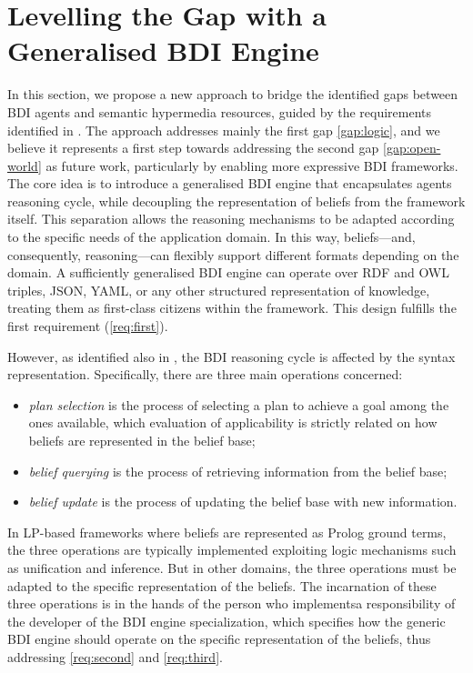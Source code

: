 \documentclass[
]{ceurart}
\begin{document}
\section{Levelling the Gap with a Generalised BDI Engine}
\label{sec:generalized-bdi-engine}

In this section,
we propose a new approach to bridge the identified gaps between \ac{BDI} agents and semantic hypermedia resources,
guided by the requirements identified in .
%
The approach addresses mainly the first gap \ref{gap:logic}, 
and we believe it represents a first step towards addressing the second gap \ref{gap:open-world} as future work,
particularly by enabling more expressive \ac{BDI} frameworks.
%
The core idea is to introduce a generalised \ac{BDI} engine that encapsulates agents reasoning cycle, 
while decoupling the representation of beliefs from the framework itself. 
%
This separation allows the reasoning mechanisms to be adapted according to the specific needs of the application domain.
%
In this way, beliefs---and, consequently, reasoning---can flexibly support different formats depending on the domain. 
%
A sufficiently generalised \ac{BDI} engine can operate over \ac{RDF} and \ac{OWL} triples, JSON, YAML, or any other structured representation of knowledge, treating them as first-class citizens within the framework. 
%
This design fulfills the first requirement (\ref{req:first}).

However,
as identified also in \cite{DBLP:conf/dalt/MoreiraVBH05}, 
the \ac{BDI} reasoning cycle is affected by the syntax representation.
%
Specifically,
there are three main operations concerned:
\begin{itemize} 
  \item \emph{plan selection} is the process of selecting a plan to achieve a goal among the ones available, 
  which evaluation of applicability is strictly related on how beliefs are represented in the belief base;
  \item \emph{belief querying} is the process of retrieving information from the belief base;
  \item \emph{belief update} is the process of updating the belief base with new information.
\end{itemize}
%
In \ac{LP}-based frameworks where beliefs are represented as Prolog ground terms, 
the three operations are typically implemented exploiting logic mechanisms such as unification and inference.
%
But in other domains,
the three operations must be adapted to the specific representation of the beliefs.
%
The incarnation of these three operations is in the hands of the person who implementsa responsibility of the developer of the \ac{BDI} engine specialization,
which specifies how the generic \ac{BDI} engine should operate on the specific representation of the beliefs,
thus addressing \ref{req:second} and \ref{req:third}. 
\end{document}
